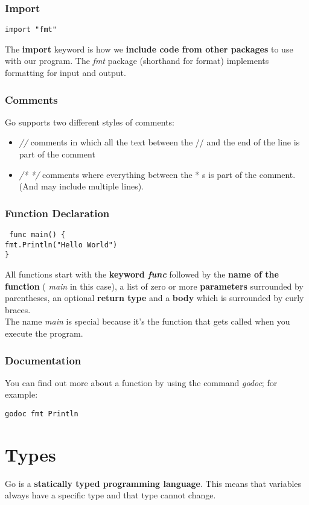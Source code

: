 \documentclass[10pt,letterpaper]{report}
\begin{document}
\subsection{Import}
\begin{lstlisting}
import "fmt"
\end{lstlisting}
The \textbf{import} keyword is how we \textbf{include code from other packages} to use with our program. The \textit{fmt} package (shorthand for format) implements formatting for input and output.\\
\subsection{Comments}
Go supports two different styles of comments:
\begin{itemize}
 \item \textit{//} comments in which all the text between the // and the end of the line is part of the comment
 \item \textit{/* */} comments where everything between the * s is part of the comment. (And may include multiple lines).
 \end{itemize}
 \subsection{Function Declaration}
 \begin{lstlisting}
 func main() {
fmt.Println("Hello World")
}
\end{lstlisting}
All functions start with the \textbf{keyword \textit{func}} followed by the \textbf{name of the function} ( \textit{main} in this case), a list of zero or more \textbf{parameters} surrounded by parentheses, an optional \textbf{return type} and a \textbf{body} which is surrounded by curly braces.\\
The name \textit{main} is special because it's the function that gets called when you execute the program.\\
\subsection{Documentation}
You can find out more about a function by using the command \textit{godoc}; for example:
\begin{lstlisting}
godoc fmt Println
\end{lstlisting}
\chapter{Types}
Go is a \textbf{statically typed programming language}. This means that variables always have a specific type and that type cannot change.
\end{document}
